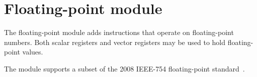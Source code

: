 %

\chapter{Floating-point module}

The floating-point module adds instructions that operate on floating-point
numbers. Both scalar registers and vector registers may be used to hold
floating-point values.

The module supports a subset of the 2008 IEEE-754 floating-point
standard~\cite{ieee754-2008}.

\tbd
